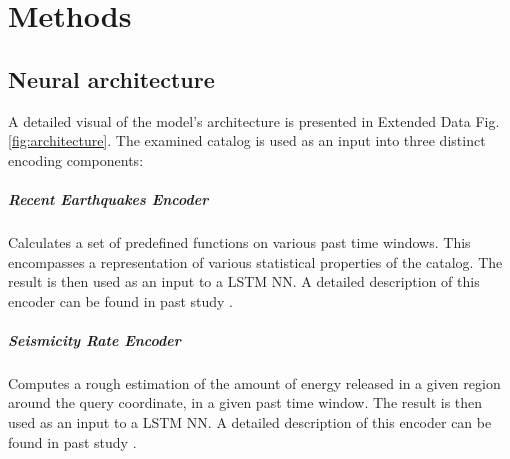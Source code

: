\documentclass[pdflatex]{sn-jnl}
\begin{document}
\let\oldbibliography\thebibliography
\renewcommand{\thebibliography}[1]{%
  \oldbibliography{#1}%
  \setlength{\itemsep}{10pt}%
}
% 
% 
\newpage


\let\oldthebibliography=\thebibliography
\let\oldendthebibliography=\endthebibliography
\renewenvironment{thebibliography}[1]{
    \oldthebibliography{#1}
    \setcounter{enumiv}{34}
}{\oldendthebibliography}

\newpage
\unnumbered

\unnumbered
\section{Methods}
\subsection{Neural architecture}
A detailed visual of the model's architecture is presented in Extended Data Fig. \ref{fig:architecture}. The examined catalog is used as an input into three distinct encoding components:
\subparagraph{\textbf{Recent Earthquakes Encoder}} Calculates a set of predefined functions on various past time windows. This encompasses a representation of various statistical properties of the catalog. The result is then used as an input to a LSTM NN. A detailed description of this encoder can be found in past study \cite{zlydenko_neural_2023}. 

\subparagraph{\textbf{Seismicity Rate Encoder}} Computes a rough estimation of the amount of energy released in a given region around the query coordinate, in a given past time window. The result is then used as an input to a LSTM NN. A detailed description of this encoder can be found in past study \cite{zlydenko_neural_2023}.
\end{document}

